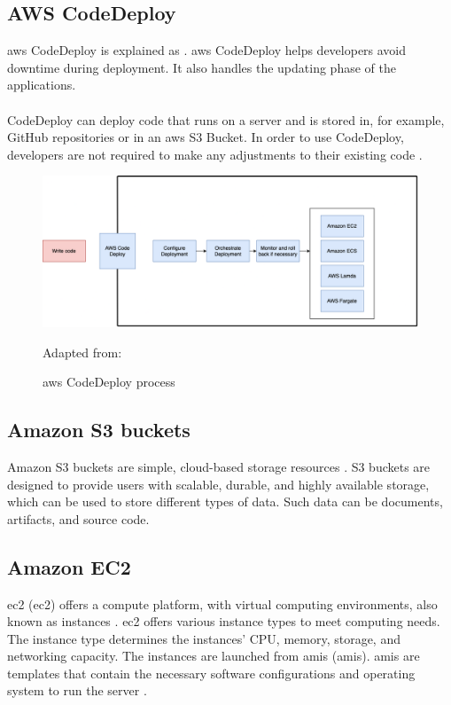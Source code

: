 \subsection{AWS CodeDeploy}
\acrshort{aws} CodeDeploy is explained as  \cite{AWSCodeDeploy}.
\acrshort{aws} CodeDeploy helps developers avoid downtime during deployment. It also handles the updating phase of the applications. 
\\~\\
CodeDeploy can deploy code that runs on a server and is stored in, for example, GitHub repositories or in an \acrshort{aws} S3 Bucket. In order to use CodeDeploy, developers are not required to make any adjustments to their existing code \cite{CodeDeploy1}.

\begin{figure}[H]
    \centering
    \includegraphics[scale=0.3]{Images/AWSCodeDeploy.png}
    \caption{\acrshort{aws} CodeDeploy process} Adapted from: \cite{CodeDeploy1}
    \label{fig: AWS CodeDeploy Process}
\end{figure}


\subsection{Amazon S3 buckets}
Amazon S3 buckets are simple, cloud-based storage resources \cite{S3Bucket}. S3 buckets are designed to provide users with scalable, durable, and highly available storage, which can be used to store different types of data. Such data can be documents, \gls{artifact}s, and source code. 

\subsection{Amazon EC2}
\acrlong{ec2} (\acrshort{ec2}) offers a \gls{compute platform}, with virtual computing environments, also known as instances \cite{awsec2}. \acrshort{ec2} offers various instance types to meet computing needs. The instance type determines the instances' CPU, memory, storage, and networking capacity. The instances are launched from \acrlong{amis} (\acrshort{amis}). \acrshort{amis} are templates that contain the necessary software configurations and operating system to run the server \cite{amis}.